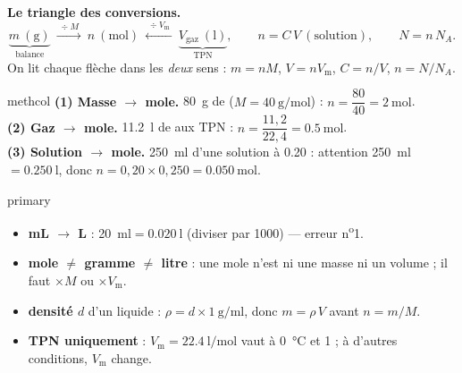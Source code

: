 \documentclass[11pt,a4paper]{article}
\newcommand{\Vm}{V_{\mathrm m}}
\begin{document}
\textbf{\color{primarydark}Le triangle des conversions.}
\[
\underbrace{m\ (\si{\gram})}_{\text{balance}}\ \xrightarrow{\;\div M\;}\ \boxed{n\ (\si{\mole})}\ \xleftarrow{\;\div \Vm\;}\ \underbrace{V_{\text{gaz}}\ (\si{\litre})}_{\text{TPN}},
\qquad n=C\,V\ (\text{solution}),\qquad N=n\,N_A .
\]
On lit chaque flèche dans les \emph{deux} sens : $m=nM$, \; $V=n\Vm$, \; $C=n/V$, \; $n=N/N_A$.

\begin{tutobox}{methcol}
\textbf{(1) Masse $\to$ mole.} \SI{80}{\gram} de  ($M=\SI{40}{\gram\per\mole}$) :
$n=\dfrac{80}{40}=\SI{2}{\mole}$.\\
\textbf{(2) Gaz $\to$ mole.} \SI{11,2}{\litre} de  aux TPN :
$n=\dfrac{11,2}{22,4}=\SI{0,5}{\mole}$.\\
\textbf{(3) Solution $\to$ mole.} \SI{250}{\milli\litre} d'une solution à \SI{0,20}{\Molar} :
attention \SI{250}{\milli\litre}$=\SI{0,250}{\litre}$, donc $n=0,20\times0,250=\SI{0,050}{\mole}$.
\end{tutobox}

\begin{tutobox}{primary}
\begin{itemize}[leftmargin=1.3em,topsep=0pt,itemsep=0pt]
  \item \textbf{mL $\to$ L} : \SI{20}{\milli\litre}$=\SI{0,020}{\litre}$ (diviser par 1000) — erreur n\textsuperscript{o}1.
  \item \textbf{mole $\neq$ gramme $\neq$ litre} : une mole n'est ni une masse ni un volume ; il faut $\times M$ ou $\times\Vm$.
  \item \textbf{densité $d$} d'un liquide : $\rho = d\times\SI{1}{\gram\per\milli\litre}$, donc $m=\rho\,V$ avant $n=m/M$.
  \item \textbf{TPN uniquement} : $\Vm=\SI{22,4}{\litre\per\mole}$ vaut à \SI{0}{\celsius} et \SI{1}{\atm} ; à d'autres conditions, $\Vm$ change.
\end{itemize}
\end{tutobox}
\end{document}
